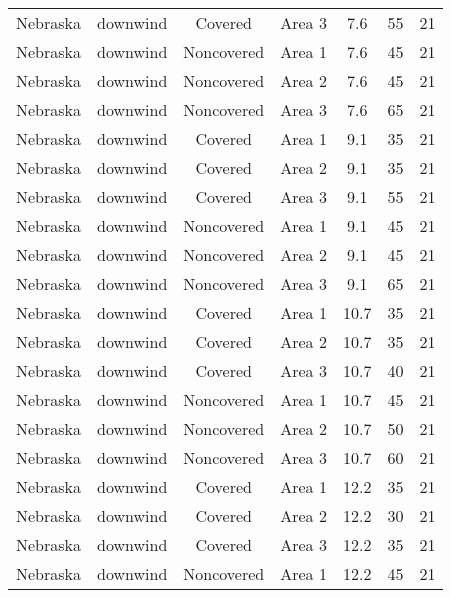 \documentclass{article}
\begin{document}
\begin{longtable}[c]{ccccccc}
Nebraska  & downwind  & Covered     & Area 3          & 7.6          & 55          & 21  \\
Nebraska  & downwind  & Noncovered & Area 1          & 7.6          & 45          & 21  \\
Nebraska  & downwind  & Noncovered & Area 2          & 7.6          & 45          & 21  \\
Nebraska  & downwind  & Noncovered & Area 3          & 7.6          & 65          & 21  \\
Nebraska  & downwind  & Covered     & Area 1          & 9.1          & 35          & 21  \\
Nebraska  & downwind  & Covered     & Area 2          & 9.1          & 35          & 21  \\
Nebraska  & downwind  & Covered     & Area 3          & 9.1          & 55          & 21  \\
Nebraska  & downwind  & Noncovered & Area 1          & 9.1          & 45          & 21  \\
Nebraska  & downwind  & Noncovered & Area 2          & 9.1          & 45          & 21  \\
Nebraska  & downwind  & Noncovered & Area 3          & 9.1          & 65          & 21  \\
Nebraska  & downwind  & Covered     & Area 1          & 10.7         & 35          & 21  \\
Nebraska  & downwind  & Covered     & Area 2          & 10.7         & 35          & 21  \\
Nebraska  & downwind  & Covered     & Area 3          & 10.7         & 40          & 21  \\
Nebraska  & downwind  & Noncovered & Area 1          & 10.7         & 45          & 21  \\
Nebraska  & downwind  & Noncovered & Area 2          & 10.7         & 50          & 21  \\
Nebraska  & downwind  & Noncovered & Area 3          & 10.7         & 60          & 21  \\
Nebraska  & downwind  & Covered     & Area 1          & 12.2         & 35          & 21  \\
Nebraska  & downwind  & Covered     & Area 2          & 12.2         & 30          & 21  \\
Nebraska  & downwind  & Covered     & Area 3          & 12.2         & 35          & 21  \\
Nebraska  & downwind  & Noncovered & Area 1          & 12.2         & 45          & 21  \\

\end{longtable}
\end{document}
